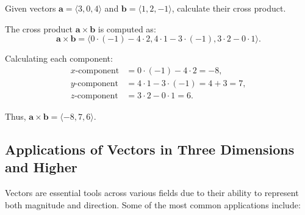 \exampleline
\begin{example}
Given vectors \( \mathbf{a} = \langle 3, 0, 4 \rangle \) and \( \mathbf{b} = \langle 1, 2, -1 \rangle \), calculate their cross product.

\begin{solution}
The cross product \( \mathbf{a} \times \mathbf{b} \) is computed as:
\[
\mathbf{a} \times \mathbf{b} = \langle 0 \cdot (-1) - 4 \cdot 2, 4 \cdot 1 - 3 \cdot (-1), 3 \cdot 2 - 0 \cdot 1 \rangle.
\]

Calculating each component:
\begin{align*}
    x\text{-component} &= 0 \cdot (-1) - 4 \cdot 2 = -8, \\
    y\text{-component} &= 4 \cdot 1 - 3 \cdot (-1) = 4 + 3 = 7, \\
    z\text{-component} &= 3 \cdot 2 - 0 \cdot 1 = 6.
\end{align*}

Thus, \( \mathbf{a} \times \mathbf{b} = \langle -8, 7, 6 \rangle \).
\end{solution}
\end{example}
\exampleline





\subsection*{Applications of Vectors in Three Dimensions and Higher}

\noindent Vectors are essential tools across various fields due to their ability to represent both magnitude and direction. Some of the most common applications include:


